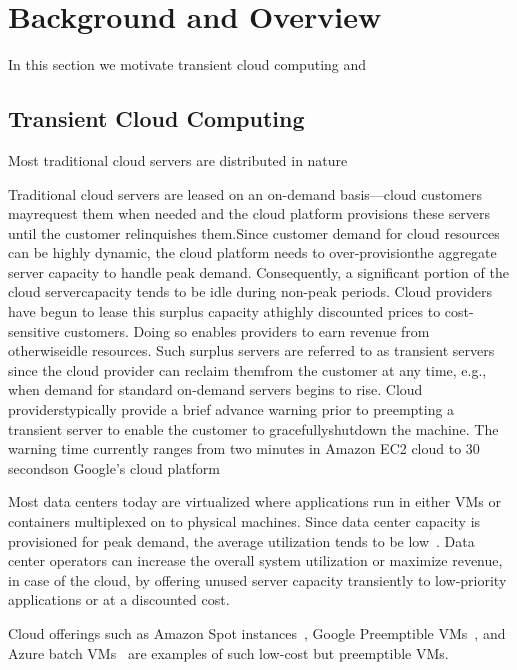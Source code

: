 
\section{Background and Overview}

In this section we motivate transient cloud computing and 

\subsection{Transient Cloud Computing}
Most traditional cloud servers are distributed in nature 

Traditional cloud servers are leased on an on-demand basis---cloud customers mayrequest them when needed and the cloud platform provisions these servers until the customer relinquishes them.Since customer demand for cloud resources can be highly dynamic, the cloud platform needs to over-provisionthe aggregate server capacity to handle peak demand. Consequently, a significant portion of the cloud servercapacity tends to be idle during non-peak periods. Cloud providers have begun to lease this surplus capacity athighly discounted prices to cost-sensitive customers. Doing so enables providers to earn revenue from otherwiseidle resources. Such surplus servers are referred to as transient servers since the cloud provider can reclaim themfrom the customer at any time, e.g., when demand for standard on-demand servers begins to rise. Cloud providerstypically provide a brief advance warning prior to preempting a transient server to enable the customer to gracefullyshutdown the machine. The warning time currently ranges from two minutes in Amazon EC2 cloud to 30 secondson Google’s cloud platform

Most data centers today are virtualized where applications run in either VMs or containers multiplexed on to physical machines. 
Since data center capacity is provisioned for peak demand, the average utilization tends to be low~\cite{borg,resource-central-sosp17}. 
Data center operators can increase the overall system utilization or maximize revenue, in case of the cloud, by offering unused server capacity transiently to low-priority
applications or at a discounted cost.

Cloud offerings such as Amazon Spot instances~\cite{spot-web}, Google Preemptible VMs~\cite{preemptible}, and Azure batch VMs~\cite{azure-batch} are examples of such 
low-cost but preemptible VMs. 



